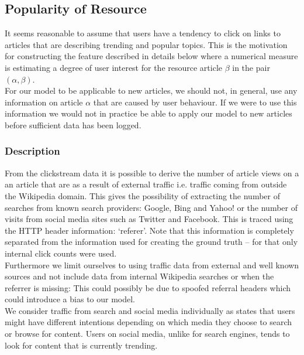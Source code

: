 \subsection{Popularity of Resource}
It seems reasonable to assume that users have a tendency to click on links to articles that are describing trending and popular topics. This is the motivation for constructing the feature described in details below where a numerical measure is estimating a degree of user interest for the resource article $\beta$ in the pair $(\alpha, \beta)$. \\

For our model to be applicable to new articles, we should not, in general, use any information on article $\alpha$ that are caused by user behaviour. If we were to use this information we would not in practice be able to apply our model to new articles before sufficient data has been logged. 


\subsubsection{Description}
From the clickstream data it is possible to derive the number of article views on a an article that are as a result of external traffic i.e. traffic coming from outside the Wikipedia domain. This gives the possibility of extracting the number of searches from known search providers: Google, Bing and Yahoo! or the number of visits from social media sites such as Twitter and Facebook. This is traced using the HTTP header information: `referer'. Note that this information is completely separated from the information used for creating the ground truth -- for that only internal click counts were used.\\

Furthermore we limit ourselves to using traffic data from external and well known sources and not include data from internal Wikipedia searches or when the referrer is missing: This could possibly be due to spoofed referral headers which could introduce a bias to our model.\\

We consider traffic from search and social media individually as  states that users might have different intentions depending on which media they choose to search or browse for content. Users on social media, unlike for search engines, tends to look for content that is currently trending.

